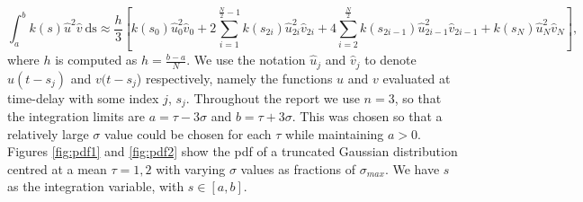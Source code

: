 \documentclass[12pt]{report}
\begin{document}
\begin{equation}\label{simp}\int_{a}^{b}k(s)\hat{u}^2\hat{v}\  \text{ds}\approx\frac{h}{3}\left[k(s_0)\hat{u}^2_0\hat{v}_0+2\sum_{i=1}^{\frac{N}{2}-1}k(s_{2i})\hat{u}^2_{2i}\hat{v}_{2i}+4\sum_{i=2}^{\frac{N}{2}}k(s_{2i-1})\hat{u}^2_{2i-1}\hat{v}_{2i-1}+k(s_N)\hat{u}^2_N\hat{v}_N\right],
\end{equation}
where $h$ is computed as $h=\frac{b-a}{N}$. We use the notation $\hat{u}_j$ and $\hat{v}_j$ to denote $u(t-s_j)$ and $v(t-s_j$) respectively, namely the functions $u$ and $v$ evaluated at time-delay with some index $j$, $s_j$. Throughout the report we use $n=3$, so that the integration limits are $a=\tau-3\sigma$ and $b=\tau+3\sigma$. This was chosen so that a relatively large $\sigma$ value could be chosen for each $\tau$ while maintaining $a>0$.
Figures \ref{fig:pdf1} and \ref{fig:pdf2} show the pdf of a truncated Gaussian distribution centred at a mean $\tau=1,2$ with varying $\sigma$ values as fractions of $\sigma_{max}$. We have $s$ as the integration variable, with $s\in[a,b]$.
\end{document}
